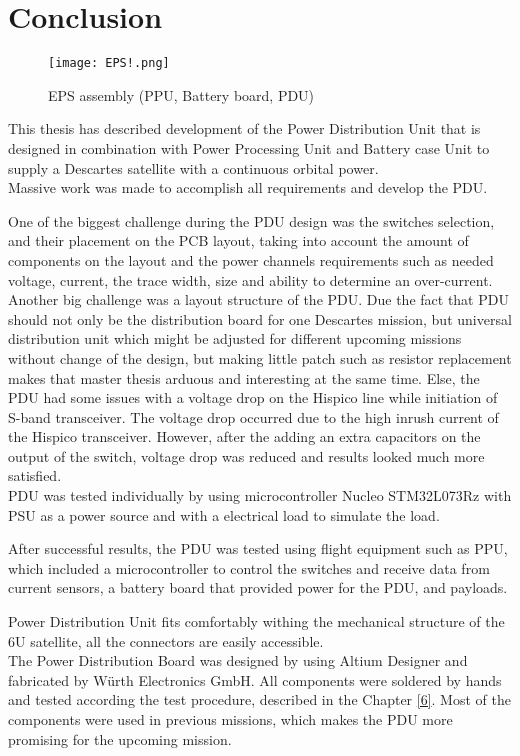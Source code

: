 \chapter{Conclusion\label{cha:chapter7}}

 \begin{figure}[h]
 	\centering
 	\texttt{[image: EPS!.png]}
 	\caption{EPS assembly (PPU, Battery board, PDU)}
 	\label{fig: EPS!}
 \end{figure}

This thesis has described development of the Power Distribution Unit that is designed in combination with Power Processing Unit and Battery case Unit to supply a Descartes satellite with a continuous orbital power.\\  


Massive work was made to accomplish all requirements and develop the PDU.

 One of the biggest challenge during the PDU design was the switches selection, and their placement on the PCB layout, taking into account the amount of components on the layout and the power channels requirements such as needed voltage, current, the trace width, size and ability to determine an over-current. Another big challenge was a layout structure of the PDU. Due the fact that PDU should not only be the distribution board for one Descartes mission, but universal distribution unit which might be adjusted for different upcoming missions without change of the design, but making little patch such as resistor replacement makes that master thesis arduous and interesting at the same time. Else, the PDU had some issues with a voltage drop on the Hispico line while initiation of S-band transceiver. The voltage drop occurred due to the high inrush current of the Hispico transceiver.    However, after the adding an extra capacitors on the output of the switch, voltage drop was reduced and results looked much more satisfied.    \\

PDU was tested individually by using microcontroller Nucleo STM32L073Rz with PSU as a power source and with a electrical load to simulate the load. 

After successful results, the PDU was tested using flight equipment such as PPU, which included a microcontroller to control the switches and receive data from current sensors, a battery board that provided power for the PDU, and payloads. 

Power Distribution Unit fits comfortably withing the mechanical structure of the 6U satellite, all the connectors are easily accessible. 
\\
The Power Distribution Board was designed by using Altium Designer and fabricated by Würth Electronics GmbH. All components were soldered by hands and tested according the test procedure, described in the Chapter \ref{6}. Most of the components were used in previous missions, which makes the PDU more promising for the upcoming mission.  \\

